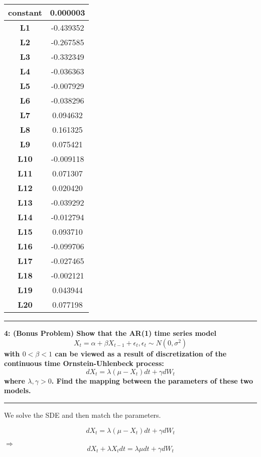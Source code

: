 \documentclass[11pt]{article}
\newcommand\question[2]{\vspace{.25in}\hrule\textbf{#1: #2}\vspace{.5em}\hrule\vspace{.10in}}
\begin{document}
{\begin{center}
	\centering
	\begin{tabular}{|c|c|}
		\hline 
		\textbf{constant}&0.000003\\ 
		\hline 
		\textbf{L1}&-0.439352  \\ 
		\hline 
		\textbf{L2}&-0.267585  \\ 
		\hline 
		\textbf{L3}&-0.332349  \\ 
		\hline 
		\textbf{L4}&-0.036363  \\ 
		\hline 
		\textbf{L5}&-0.007929  \\ 
		\hline 
		\textbf{L6}&-0.038296  \\ 
		\hline
		\textbf{L7}&0.094632  \\ 
		\hline 
		\textbf{L8}&0.161325  \\ 
		\hline 
		\textbf{L9}&0.075421  \\ 
		\hline 
		\textbf{L10}&-0.009118  \\ 
		\hline 
		\textbf{L11}&0.071307  \\ 
		\hline 
		\textbf{L12}&0.020420  \\ 
		\hline 
		\textbf{L13}&-0.039292  \\ 
		\hline 
		\textbf{L14}&-0.012794  \\ 
		\hline 
		\textbf{L15}&0.093710  \\ 
		\hline  
		\textbf{L16}&-0.099706  \\ 
		\hline  
		\textbf{L17}&-0.027465  \\ 
		\hline  
		\textbf{L18}&-0.002121  \\ 
		\hline  
		\textbf{L19}&0.043944  \\ 
		\hline  
		\textbf{L20}&0.077198  \\ 
		\hline  
	\end{tabular}
\end{center}

\question{4}{(Bonus Problem) Show that the AR(1) time series model $$X_t=\alpha + \beta X_{t-1} + \epsilon_{t}, \epsilon_{t} \sim N(0,\sigma^2)$$ with $0 < \beta < 1$ can be viewed as a result of discretization of the continuous time Ornstein-Uhlenbeck process: $$dX_t = \lambda(\mu - X_t)dt + \gamma dW_t$$ where $\lambda, \gamma > 0$. Find the mapping between the parameters of these two models.}

We solve the SDE and then match the parameters. 

$$ dX_{t} = \lambda ( \mu - X_{t}) dt + \gamma dW_{t} $$

$\Rightarrow$ $$ dX_{t} + \lambda X_{t} dt = \lambda  \mu  dt + \gamma dW_{t} $$

}
\end{document}
